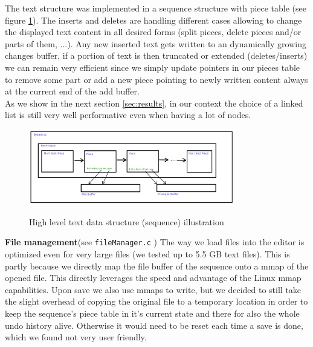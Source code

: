 The text structure was implemented in a sequence structure with piece table (see figure \ref{fig:sequence}). The inserts and deletes are handling different cases allowing to change the displayed text content in all desired forms (split pieces, delete pieces and/or parts of them, ...). Any new inserted text gets written to an dynamically growing changes buffer, if a portion of text is then truncated or extended (deletes/inserts) we can remain very efficient since we simply update pointers in our pieces table to remove some part or add a new piece pointing to newly written content always at the current end of the add buffer. \\
As we show in the next section \ref{sec:results}, in our context the choice of a linked list is still very well performative even when having a lot of nodes.

\begin{figure}[H]
\caption{High level text data structure (sequence) illustration}
\centering
\includegraphics[width=0.8\textwidth]{./images/sequenceIllustration.png}
\label{fig:sequence}
\end{figure}

\textbf{File management}(see \verb|fileManager.c| \cite{GithubRepo}) The way we load files into the editor is optimized even for very large files (we tested up to 5.5 GB text files). This is partly because we directly map the file buffer of the sequence onto a mmap of the opened file. This directly leverages the speed and advantage of the Linux mmap capabilities. Upon save we also use mmaps to write, but we decided to still take the slight overhead of copying the original file to a temporary location in order to keep the sequence's piece table in it's current state and there for also the whole undo history alive. Otherwise it would need to be reset each time a save is done, which we found not very user friendly. 

